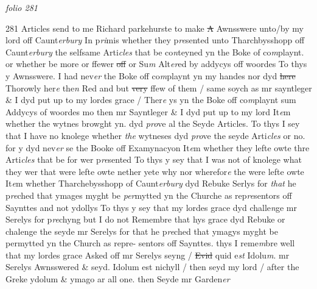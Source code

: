 \documentclass[12pt, a4paper]{book}
\begin{document}
\textit{folio 281}



{\color{Mahogany}281} Articles send to me Richard parkehurste to make \sout{A} Awnsswere unto/by my lord off Caunt\textit{erbury}  
				\marginpar[\vspace{0.5cm}{\textcolor{Gray}{1}}]{}
			 In p\textit{ri}mis whether they p\textit{re}sented unto Tharchbysshopp off Caunt\textit{erbury} the selfsame Arti\textit{cles} that be co\textit{n}teyned yn the Boke of co\textit{m}playnt. or whether be more or ffewer \sout{off }or Su\textit{m} Alt\textit{er}ed by addycys off woordes To thys y Awnsswere. I had nev\textit{er} the Boke off co\textit{m}playnt yn my handes nor dyd \sout{here }Thorowly her\textit{e} the\textit{n} Red and but \sout{very }ffew of them / same soych as  mr sayntleger \& I dyd put up to my lordes grace / Ther\textit{e} ys yn the Boke off co\textit{m}playnt sum Addycys of woordes mo then mr Sayntleger \& I dyd put up to my lord 
				\marginpar[\vspace{0.5cm}{\textcolor{Gray}{2}}]{}
			 It\textit{e}m whether the wytnes browght yn. dyd \textit{pro}ve al the Seyde Articles.  To thys I sey that I have no knolege whether \textit{the} wytneses dyd \textit{pro}ve the seyde Arti\textit{cles} or no. for y dyd nev\textit{er} se the Booke off Examynacyon 
				\marginpar[\vspace{0.5cm}{\textcolor{Gray}{3}}]{}
			 It\textit{e}m whether they lefte owte thre Arti\textit{cles} that be for wer p\textit{re}sented  To thys y sey that I was not of knolege what they wer that were
			 lefte owte nether yete why nor wherefor\textit{e} the were lefte owte 
				\marginpar[\vspace{0.5cm}{\textcolor{Gray}{4}}]{}
			 It\textit{e}m whether Tharchebysshopp of Caunt\textit{erbury} dyd Rebuke Serlys for \textit{that} he p\textit{re}ched that ymages myght be \textit{per}mytted yn the Churche as rep\textit{re}sentors off Saynttes  and not ydollys To thys y sey that my lordes grace dyd challe\textit{n}ge mr Serelys for p\textit{re}chyng but I do not Remembre that hys grace dyd Rebuke or chalenge the seyde mr Serelys for that he p\textit{re}ched that ymagys myght be permytted yn the Church as repre- sentors off Saynttes. thys I reme\textit{m}bre well that my lordes grace Asked off mr Serelys seyng / \sout{Evid }quid e\textit{st} Idolu\textit{m}. mr Serelys Awnsswered \& seyd. Idolum  est nichyll / then seyd my lord / after the Greke ydolum \& ymago ar all one. then Seyde mr Garden\textit{er}
\end{document}
